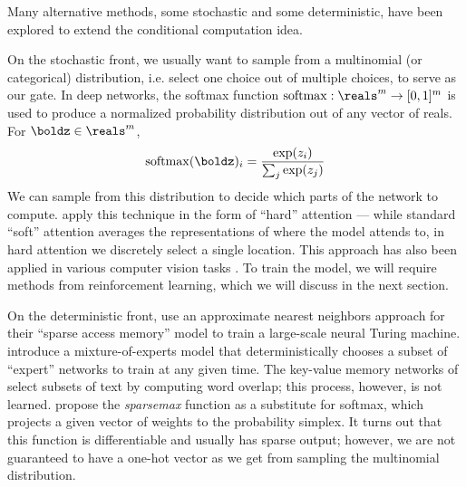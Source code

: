 \documentclass[12pt]{report}
\begin{document}
Many alternative methods, some stochastic and some deterministic, have been explored to extend the conditional computation idea.

On the stochastic front, we usually want to sample from a multinomial (or categorical) distribution, i.e. select one choice out of multiple choices, to serve as our gate. In deep networks, the softmax function $\operatorname{softmax} : \reals^m \to [0,1]^m$ is used to produce a normalized probability distribution out of any vector of reals. For $\boldz \in \reals^m$,
\begin{equation}
\operatorname{softmax}(\boldz)_i = \frac{\exp(z_i)}{\sum_j \exp(z_j)}
\end{equation}
We can sample from this distribution to decide which parts of the network to compute. \citet{xu2015captioning} apply this technique in the form of ``hard'' attention --- while standard ``soft'' attention averages the representations of where the model attends to, in hard attention we discretely select a single location.
This approach has also been applied in various computer vision tasks \citep{mnih2014visualattention, ba2015visualattention}.
 To train the model, we will require methods from reinforcement learning, which we will discuss in the next section.



On the deterministic front, \citet{rae2016sparsememory} use an approximate nearest neighbors approach for their ``sparse access memory'' model to train a large-scale neural Turing machine.
\citet{Shazeer2017} introduce a mixture-of-experts model that deterministically chooses a subset of ``expert'' networks to train at any given time.
The key-value memory networks of \citet{Miller2016} select subsets of text by computing word overlap; this process, however, is not learned.
 \citet{martins2016sparsemax} propose the \emph{sparsemax} function as a substitute for softmax, which projects a given vector of weights to the probability simplex. It turns out that this function is differentiable and usually has sparse output; however, we are not guaranteed to have a one-hot vector as we get from sampling the multinomial distribution.
\end{document}
